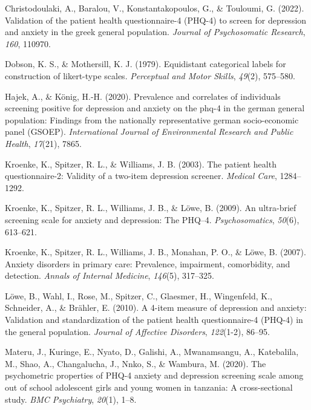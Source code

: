 \documentclass[
  man,floatsintext]{apa6}
\newlength{\cslhangindent}
\newlength{\cslentryspacingunit} %
\newenvironment{CSLReferences}[2] %
 {%
  \setlength{\parindent}{0pt}
  \ifodd #1
  \let\oldpar\par
  \def\par{\hangindent=\cslhangindent\oldpar}
  \fi
  \setlength{\parskip}{#2\cslentryspacingunit}
 }%
 {}
\begin{document}
\hypertarget{refs}{}
\begin{CSLReferences}{1}{0}
\leavevmode{}%
Christodoulaki, A., Baralou, V., Konstantakopoulos, G., \& Touloumi, G. (2022). Validation of the patient health questionnaire-4 (PHQ-4) to screen for depression and anxiety in the greek general population. \emph{Journal of Psychosomatic Research}, \emph{160}, 110970.

\leavevmode{}%
Dobson, K. S., \& Mothersill, K. J. (1979). Equidistant categorical labels for construction of likert-type scales. \emph{Perceptual and Motor Skills}, \emph{49}(2), 575--580.

\leavevmode{}%
Hajek, A., \& König, H.-H. (2020). Prevalence and correlates of individuals screening positive for depression and anxiety on the phq-4 in the german general population: Findings from the nationally representative german socio-economic panel (GSOEP). \emph{International Journal of Environmental Research and Public Health}, \emph{17}(21), 7865.

\leavevmode{}%
Kroenke, K., Spitzer, R. L., \& Williams, J. B. (2003). The patient health questionnaire-2: Validity of a two-item depression screener. \emph{Medical Care}, 1284--1292.

\leavevmode{}%
Kroenke, K., Spitzer, R. L., Williams, J. B., \& Löwe, B. (2009). An ultra-brief screening scale for anxiety and depression: The PHQ--4. \emph{Psychosomatics}, \emph{50}(6), 613--621.

\leavevmode{}%
Kroenke, K., Spitzer, R. L., Williams, J. B., Monahan, P. O., \& Löwe, B. (2007). Anxiety disorders in primary care: Prevalence, impairment, comorbidity, and detection. \emph{Annals of Internal Medicine}, \emph{146}(5), 317--325.

\leavevmode{}%
Löwe, B., Wahl, I., Rose, M., Spitzer, C., Glaesmer, H., Wingenfeld, K., Schneider, A., \& Brähler, E. (2010). A 4-item measure of depression and anxiety: Validation and standardization of the patient health questionnaire-4 (PHQ-4) in the general population. \emph{Journal of Affective Disorders}, \emph{122}(1-2), 86--95.

\leavevmode{}%
Materu, J., Kuringe, E., Nyato, D., Galishi, A., Mwanamsangu, A., Katebalila, M., Shao, A., Changalucha, J., Nnko, S., \& Wambura, M. (2020). The psychometric properties of PHQ-4 anxiety and depression screening scale among out of school adolescent girls and young women in tanzania: A cross-sectional study. \emph{BMC Psychiatry}, \emph{20}(1), 1--8.


\end{CSLReferences}
\end{document}
